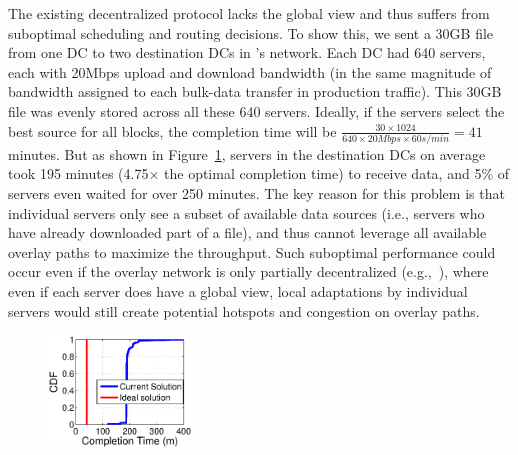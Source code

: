 The existing decentralized protocol lacks the global view and thus 
suffers from suboptimal scheduling and routing decisions.
To show this, we sent a 30GB file from one DC to two destination
DCs in \company's network. Each DC had 640 servers, each with 20Mbps 
upload and download bandwidth (in the same magnitude of bandwidth 
assigned to each bulk-data transfer in production traffic).
This 30GB file was evenly stored across all these 640 servers.
Ideally, if the servers select the best source for all blocks, the 
completion time will be
$\frac{30\times 1024}{640\times 20Mbps \times 60s/min} = 41$
minutes. But as shown in Figure~\ref{fig:motivation},
servers in the destination DCs on average took 195 minutes (4.75$\times$ 
the optimal completion time) to receive data, and 5\% of servers even 
waited for over 250 minutes.
The key reason for this problem is that individual servers only see a subset of 
available data sources (i.e., servers who have already downloaded part of 
a file), and thus cannot leverage all available overlay paths to
maximize the throughput. Such suboptimal performance could occur even if 
the overlay network is only partially decentralized (e.g.,~\cite{Huang2014A}), 
where even if each server does have a global view, local adaptations by 
individual servers would still create potential hotspots and congestion on 
overlay paths.


\begin{figure}[t]
  \centering
  \includegraphics[width=1.5in]{images/SEvsIdeal.eps}
  \vspace{-0.2cm}
  \label{fig:motivation}
\vspace{-0.4cm}
\end{figure}

